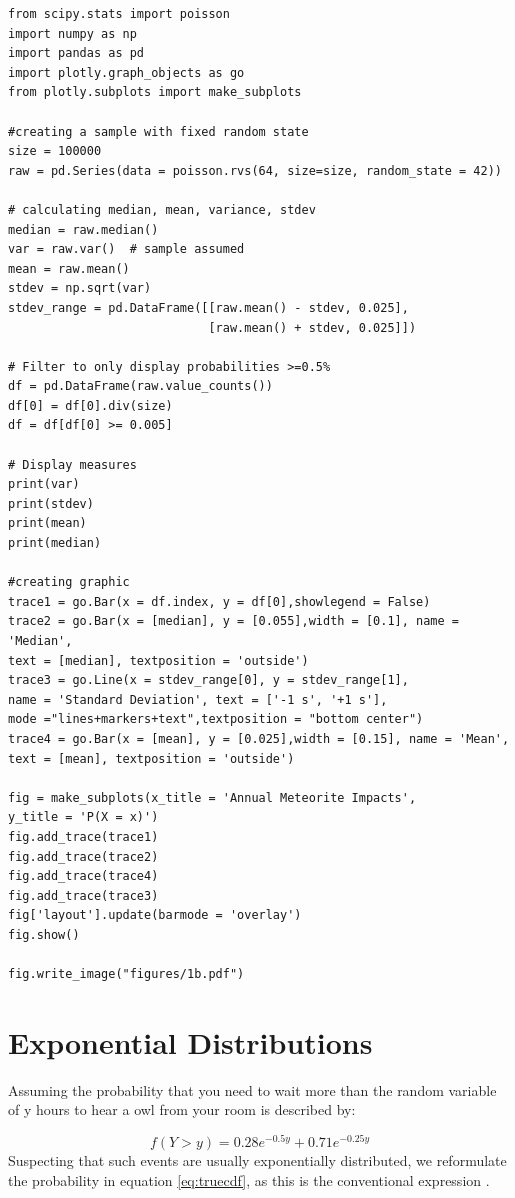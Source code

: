 \begin{lstlisting}
from scipy.stats import poisson
import numpy as np
import pandas as pd
import plotly.graph_objects as go
from plotly.subplots import make_subplots

#creating a sample with fixed random state
size = 100000
raw = pd.Series(data = poisson.rvs(64, size=size, random_state = 42))

# calculating median, mean, variance, stdev
median = raw.median()
var = raw.var()  # sample assumed
mean = raw.mean()
stdev = np.sqrt(var)
stdev_range = pd.DataFrame([[raw.mean() - stdev, 0.025],
                            [raw.mean() + stdev, 0.025]])

# Filter to only display probabilities >=0.5%
df = pd.DataFrame(raw.value_counts())
df[0] = df[0].div(size)
df = df[df[0] >= 0.005]

# Display measures
print(var)
print(stdev)
print(mean)
print(median)

#creating graphic
trace1 = go.Bar(x = df.index, y = df[0],showlegend = False)
trace2 = go.Bar(x = [median], y = [0.055],width = [0.1], name = 'Median', 
text = [median], textposition = 'outside')
trace3 = go.Line(x = stdev_range[0], y = stdev_range[1], 
name = 'Standard Deviation', text = ['-1 s', '+1 s'],
mode ="lines+markers+text",textposition = "bottom center")
trace4 = go.Bar(x = [mean], y = [0.025],width = [0.15], name = 'Mean', 
text = [mean], textposition = 'outside')

fig = make_subplots(x_title = 'Annual Meteorite Impacts',
y_title = 'P(X = x)')
fig.add_trace(trace1)
fig.add_trace(trace2)
fig.add_trace(trace4)
fig.add_trace(trace3)
fig['layout'].update(barmode = 'overlay')
fig.show()

fig.write_image("figures/1b.pdf")
\end{lstlisting}

\section{Exponential Distributions}
Assuming the probability that you need to wait more than the random variable of y hours to hear a owl from your room is described by:

\begin{equation}  f(Y > y) = 0.28e^{-0.5y} + 0.71e^{-0.25y}
\label{eq:initcdf}
\end{equation}
Suspecting that such events are usually exponentially distributed, we reformulate the probability in equation \ref{eq:truecdf}, as this is the conventional expression \cite{deisenroth}. 

